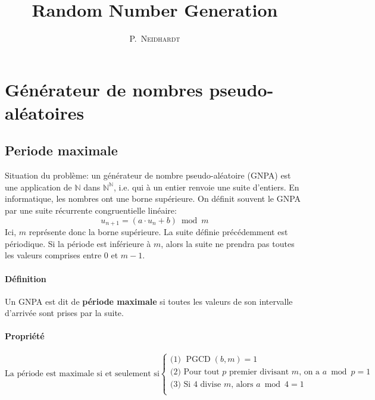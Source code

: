 \documentclass[10pt,a4paper]{article}
\title{Random Number Generation}
\author{\textsc{P.~Neidhardt}}
\DeclareMathOperator{\pgcd}{PGCD}
\def\N{\mathbb{N}}
\begin{document}
\maketitle
\vfill
\thispagestyle{empty}


\section{Générateur de nombres pseudo-aléatoires}

\subsection{Periode maximale}

Situation du problème: un générateur de nombre pseudo-aléatoire (GNPA) est une application de $\N$ dans $\N^\N$, i.e. qui à un entier renvoie une suite d'entiers.
En informatique, les nombres ont une borne supérieure. On définit souvent le GNPA par une suite récurrente congruentielle linéaire:
\[
u_{n+1} = (a \cdot u_n + b) \bmod m
\]
Ici, $m$ représente donc la borne supérieure. La suite définie précédemment est périodique.
Si la période est inférieure à $m$, alors la suite ne prendra pas toutes les valeurs comprises entre $0$ et $m-1$.

\paragraph{Définition}
Un GNPA est dit de \textbf{période maximale} si toutes les valeurs de son intervalle d'arrivée sont prises par la suite.

\paragraph{Propriété}

\[
\text{La période est maximale si et seulement si}
\left\{
  \begin{array}{l}
    \text{(1) } \pgcd(b,m) = 1 \\
    \text{(2) } \text{Pour tout $p$ premier divisant $m$, on a } a \bmod p = 1 \\
    \text{(3) } \text{Si 4 divise $m$, alors } a \bmod 4 = 1 \\
  \end{array}
\right.
\]
\end{document}
